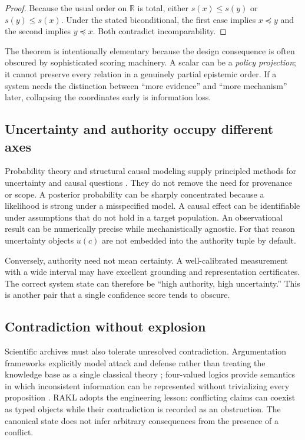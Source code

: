 \begin{proof}
Because the usual order on \(\mathbb R\) is total, either \(s(x)\le s(y)\) or \(s(y)\le s(x)\). Under the stated biconditional, the first case implies \(x\preceq y\) and the second implies \(y\preceq x\). Both contradict incomparability.
\end{proof}

The theorem is intentionally elementary because the design consequence is often obscured by sophisticated scoring machinery. A scalar can be a \emph{policy projection}; it cannot preserve every relation in a genuinely partial epistemic order. If a system needs the distinction between ``more evidence'' and ``more mechanism'' later, collapsing the coordinates early is information loss.

\subsection{Uncertainty and authority occupy different axes}

Probability theory and structural causal modeling supply principled methods for uncertainty and causal questions \cite{pearl2009,halpern2016}. They do not remove the need for provenance or scope. A posterior probability can be sharply concentrated because a likelihood is strong under a misspecified model. A causal effect can be identifiable under assumptions that do not hold in a target population. An observational result can be numerically precise while mechanistically agnostic. For that reason uncertainty objects \(u(c)\) are not embedded into the authority tuple by default.

Conversely, authority need not mean certainty. A well-calibrated measurement with a wide interval may have excellent grounding and representation certificates. The correct system state can therefore be ``high authority, high uncertainty.'' This is another pair that a single confidence score tends to obscure.

\subsection{Contradiction without explosion}

Scientific archives must also tolerate unresolved contradiction. Argumentation frameworks explicitly model attack and defense rather than treating the knowledge base as a single classical theory \cite{dung1995}; four-valued logics provide semantics in which inconsistent information can be represented without trivializing every proposition \cite{belnap1977}. RAKL adopts the engineering lesson: conflicting claims can coexist as typed objects while their contradiction is recorded as an obstruction. The canonical state does not infer arbitrary consequences from the presence of a conflict.


